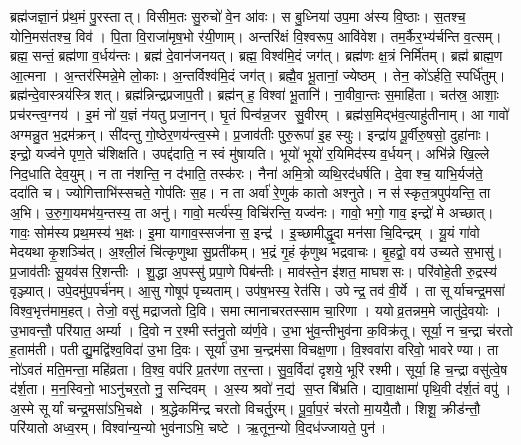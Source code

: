 ब्रह्म॑जज्ञा॒नं प्र॑थ॒मं पु॒रस्तात्। विसीम॒तः सु॒रुचो॑ वे॒न आ॑वः।
स बु॒ध्निया॑ उप॒मा अ॑स्य वि॒ष्ठाः। स॒तश्च॒ योनि॒मस॑तश्च॒ विव॑।
पि॒ता वि॒राजा॑मृष॒भो र॑यी॒णाम्। अन्तरि॑क्षं वि॒श्वरूप॒ आवि॑वेश।
तम॒र्कैर॒भ्य॑र्चन्ति व॒त्सम्। ब्रह्म॒ सन्तं॒ ब्रह्म॑णा व॒र्धय॑न्तः।
ब्रह्म॑ दे॒वान॑जनयत्। ब्रह्म॒ विश्व॑मि॒दं जग॑त्।
ब्रह्म॑णः क्ष॒त्रं निर्मि॑तम्। ब्रह्म॑ ब्राह्म॒ण आ॒त्मना।
अ॒न्तर॑स्मिन्ने॒मे लो॒काः। अ॒न्तर्विश्व॑मि॒दं जग॑त्।
ब्रह्मै॒व भू॒तानां॒ ज्येष्ठम्। तेन॒ को॑ऽर्हति॒ स्पर्धि॑तुम्।
ब्रह्म॑न्दे॒वास्त्रय॑स्त्रिशत्। ब्रह्म॑न्निन्द्रप्रजाप॒ती।
ब्रह्म॑न् ह॒ विश्वा॑ भू॒तानि॑। ना॒वीवा॒न्तः स॒माहि॑ता।
चत॑स्र॒ आशाः॒ प्रच॑रन्त्व॒ग्नय॑। इ॒मं नो॑ य॒ज्ञं न॑यतु प्रजा॒नन्।
घृ॒तं पिन्व॑न्न॒जर सु॒वीरम्। ब्रह्म॑स॒मिद्भ॑व॒त्याहु॑तीनाम्।
आ गावो॑ अग्मन्नु॒त भ॒द्रम॑क्रन्। सी॑दन्तु गो॒ष्ठेर॒णय॑न्त्व॒स्मे।
प्र॒जाव॑तीः पुरु॒रूपा॑ इ॒ह स्युः। इन्द्रा॑य पू॒र्वीरु॒षसो॒ दुहा॑नाः।
इन्द्रो॒ यज्व॑ने पृण॒ते च॑शिक्षति। उपद्द॑दाति॒ न स्वं मु॑षायति।
भूयो॑ भूयो॑ र॒यिमिद॑स्य व॒र्धयन्। अभि॑न्ने खि॒ल्ले निद॒धाति देव॒युम्।
न ता न॑शन्ति॒ न द॑भाति॒ तस्क॑रः। नैना॑ अमि॒त्रो व्यथि॒रद॑धर्षति।
दे॒वाश्च॒ याभि॒र्यज॑ते॒ ददा॑ति च। ज्योगित्ताभि॑स्सचते॒ गोप॑तिः स॒ह।
न ता अर्वा॑ रे॒णुक॑ कातो अश्नुते। न स॑स्कृत॒त्रपुप॑यन्ति॒ ता अ॒भि।
उ॒रु॒गा॒यमभ॑य॒न्तस्य॒ ता अनु॑। गावो॒ मर्त्य॑स्य॒ विचि॑रन्ति॒ यज्व॑नः।
गावो॒ भगो॒ गाव॒ इन्द्रो॑ मे अच्छात्। गावः॒ सोम॑स्य प्रथ॒मस्य॑ भ॒क्षः।
इ॒मा यागाव॒स्सज॑ना स॒ इन्द्र॑। इ॒च्छामीद्धृ॒दा मन॑सा चि॒दिन्द्रम्।
यू॒यं गा॑वो मेदयथा कृ॒शञ्चि॑त्। अ॒श्ली॒लं चि॑त्कृणुथा सु॒प्रती॑कम्।
भ॒द्रं गृ॒हं कृ॑णुथ भद्रवाचः। बृ॒हद्वो॒ वय॑ उच्यते स॒भासु॑।
प्र॒जाव॑तीः सू॒यव॑सरि॒शन्तीः। शु॒द्धा अ॒पस्सु॑ प्रपा॒णे पिब॑न्तीः।
माव॑स्ते॒न इ॑शत॒ माघशसः। परि॑वोहे॒ती रु॒द्रस्य॑ वृञ्ज्यात्।
उपे॒दमु॑प॒पर्च॑नम्। आ॒सु गोषूप॑ पृच्यताम्।
उप॑ष॒भस्य॒ रेत॑सि। उपेन्द्र॒ तव॑ वी॒र्ये।
ता सूर्याचन्द्र॒मसा॑ विश्व॒भृत्त॑माम॒हत्।
तेजो॒ वसु॑ मद्राजतो दि॒वि। समात्मानाचरतस्साम चा॒रिणा।
ययोव्र॒तन्नम॒मे जातु॑दे॒वयोः। उ॒भावन्तौ॒ परि॑यात॒ अर्म्या।
दि॒वो न र॒श्मीस्त॑नु॒तो व्य॑र्ण॒वे। उ॒भा भु॑व॒न्तीभुव॑ना क॒विक्र॑तू।
सूर्या॒ न च॒न्द्रा च॑रतो ह॒ताम॑ती। पतीद्यु॒मद्वि॑श्व॒विदा॑ उ॒भा दि॒वः।
सूर्या॑ उ॒भा च॒न्द्रम॑सा विचक्ष॒णा। वि॒श्ववा॑रा वरिवो॒ भावरेण्या।
ता नो॑ऽवतं मति॒मन्ता॒ महि॑व्रता। वि॒श्व॒ वप॑रि प्र॒तर॑णा तर॒न्ता।
सु॒व॒र्विदा॑ दृशये॒ भूरि॑ रश्मी। सूर्या॒ हि च॒न्द्रा वसु॑त्वे॒ष द॑र्श॒ता।
म॒न॒स्विनो॒ भाऽनु॑चर॒तो नु॒ सन्दिवम्। अ॒स्य श्रवो॑ न॒द्य॑ स॒प्त बि॑भ्रति।
द्यावा॒क्षामा॑ पृथि॒वी द॑र्श॒तं वपु॑। अ॒स्मे सूर्यां चन्द्र॒मसा॑ऽभि॒चक्षे।
श्र॒द्धेकमि॑न्द्र चरतो विचर्तु॒रम्। पू॒र्वा॒प॒रं च॑रतो मा॒ययै॒तौ।
शिशू॒ क्रीड॑न्तौ॒ परि॑यातो अध्व॒रम्। विश्वा॑न्य॒न्यो भुव॑नाऽभि॒ चष्टे।
ऋ॒तून॒न्यो वि॒दध॑ज्जायते॒ पुन॑।

